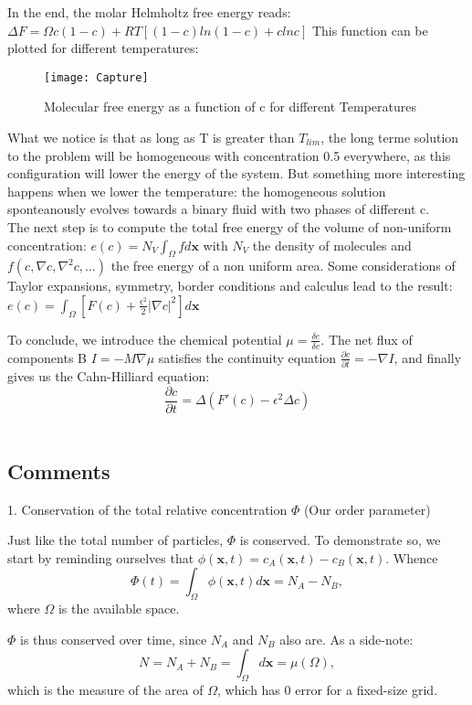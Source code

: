 \documentclass{article}
\begin{document}
In the end, the molar Helmholtz free energy reads: $\Delta F=\Omega c(1-c)+RT[(1-c)ln(1-c)+c  ln c]$
This function can be plotted for different temperatures:
\begin{figure}[h!]
\texttt{[image: Capture]}
\caption{Molecular free energy as a function of c for different Temperatures}
\end{figure}

What we notice is that as long as T is greater than $T_{lim}$, the long terme solution to the problem will be homogeneous with concentration 0.5 everywhere, as this configuration will lower the energy of the system. But something more interesting happens when we lower the temperature: the homogeneous solution sponteanously evolves towards a binary fluid with two phases of different c.\\

The next step is to compute the total free energy of the volume of non-uniform concentration: $e(c)=N_V\int_{\Omega}f d\mathbf{x}$ with $N_V$ the density of molecules and $f(c,\nabla c, \nabla^2 c,...)$ the free energy of a non uniform area. Some considerations of Taylor expansions, symmetry, border conditions and calculus lead to the result: $e(c)=\int_{\Omega}[F(c)+\frac{\epsilon^2}{2}|\nabla c|^2]d\mathbf{x}$

To conclude, we introduce the chemical potential $\mu=\frac{\delta e}{\delta c}$. The net flux of components B $I=-M\nabla \mu$ satisfies the continuity equation $\frac{\partial c}{\partial t}=-\nabla I$, and finally gives us the Cahn-Hilliard equation: $$\frac{\partial c}{\partial t}=\Delta(F'(c)-\epsilon^2\Delta c)$$\\

\subsection{Comments}
1. Conservation of the total relative concentration $\Phi$ (Our order parameter)

Just like the total number of particles, $\Phi$ is conserved.
To demonstrate so, we start by reminding ourselves that $\phi(\mathbf{x},t) = c_A(\mathbf{x},t)-c_B(\mathbf{x},t)$.
Whence \[ \Phi(t) = \int_{\Omega} \phi(\mathbf{x},t)d\mathbf{x} = N_A - N_B, \]
where $\Omega$ is the available space.

$\Phi$ is thus conserved over time, since $N_A$ and $N_B$ also are.
As a side-note: \[ N = N_A + N_B = \int_{\Omega} d\mathbf{x} = \mu(\Omega), \]
which is the measure of the area of $\Omega$, which has 0 error for a fixed-size grid.
\end{document}
